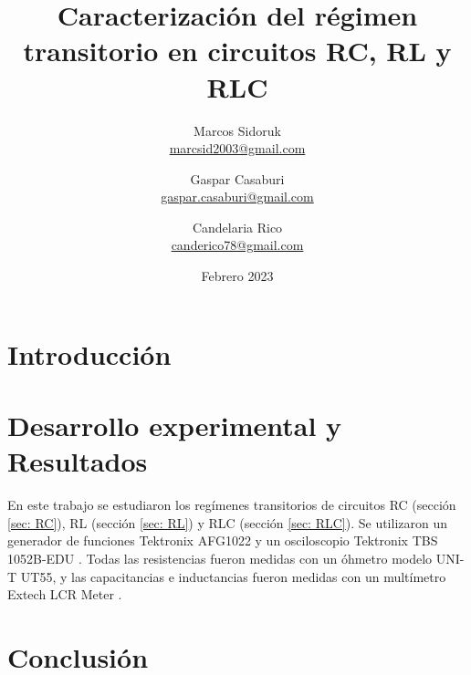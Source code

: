 \documentclass{article}
\title{Caracterización del régimen transitorio en circuitos RC, RL y RLC}
\author{Marcos Sidoruk \\ \href{mailto:marcsid2003@gmail.com}{marcsid2003@gmail.com} \and Gaspar Casaburi \\ \href{mailto:gaspar.casaburi@gmail.com}{gaspar.casaburi@gmail.com} \and Candelaria Rico \\ \href{mailto:canderico78@gmail.com}{canderico78@gmail.com}}
\date{Febrero 2023}
\begin{document}
\maketitle

\begin{abstract}
    
\end{abstract}

\section{Introducción}


\section{Desarrollo experimental y Resultados}
En este trabajo se estudiaron los regímenes transitorios de circuitos RC (sección \ref{sec: RC}), RL (sección \ref{sec: RL}) y RLC (sección \ref{sec: RLC}). Se utilizaron un generador de funciones Tektronix AFG1022 \cite{manual_generador} y un osciloscopio Tektronix TBS 1052B-EDU \cite{manual_osciloscopio}. Todas las resistencias fueron medidas con un óhmetro modelo UNI-T UT55\cite{manual_multimetro}, y las capacitancias e inductancias fueron medidas con un multímetro Extech LCR Meter \cite{manual_extech}.



\section{Conclusión}


\printbibliography
\end{document}
